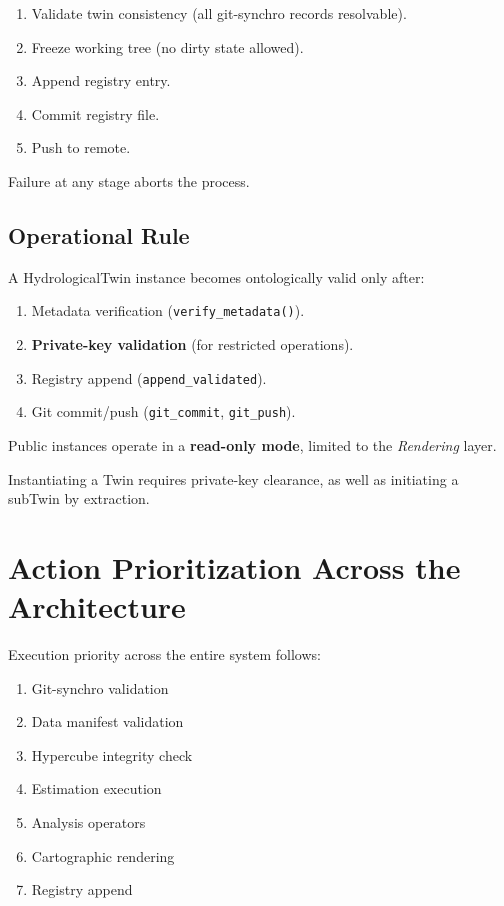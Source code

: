 \begin{enumerate}
\item Validate twin consistency (all git-synchro records resolvable).
\item Freeze working tree (no dirty state allowed).
\item Append registry entry.
\item Commit registry file.
\item Push to remote.
\end{enumerate}

Failure at any stage aborts the process.

\subsection{Operational Rule}

A HydrologicalTwin instance becomes ontologically valid only after:
\begin{enumerate}
    \item Metadata verification (\texttt{verify\_metadata()}).
    \item \textbf{Private-key validation} (for restricted operations).
    \item Registry append (\texttt{append\_validated}).
    \item Git commit/push (\texttt{git\_commit}, \texttt{git\_push}).
\end{enumerate}
Public instances operate in a \textbf{read-only mode}, limited to the \textit{Rendering} layer.

Instantiating a Twin requires private-key clearance, as well as initiating a subTwin by extraction.





\section{Action Prioritization Across the Architecture}

Execution priority across the entire system follows:

\begin{enumerate}
\item Git-synchro validation
\item Data manifest validation
\item Hypercube integrity check
\item Estimation execution
\item Analysis operators
\item Cartographic rendering
\item Registry append
\end{enumerate}

